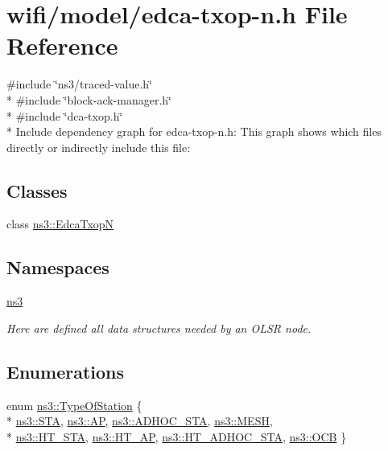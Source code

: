 \hypertarget{edca-txop-n_8h}{}\section{wifi/model/edca-\/txop-\/n.h File Reference}
\label{edca-txop-n_8h}
{\ttfamily \#include \char`\"{}ns3/traced-\/value.\+h\char`\"{}}\\*
{\ttfamily \#include \char`\"{}block-\/ack-\/manager.\+h\char`\"{}}\\*
{\ttfamily \#include \char`\"{}dca-\/txop.\+h\char`\"{}}\\*
Include dependency graph for edca-\/txop-\/n.h\+:
This graph shows which files directly or indirectly include this file\+:
\subsection*{Classes}
\begin{DoxyCompactItemize}
\item 
class \hyperlink{classns3_1_1EdcaTxopN}{ns3\+::\+Edca\+TxopN}
\end{DoxyCompactItemize}
\subsection*{Namespaces}
\begin{DoxyCompactItemize}
\item 
 \hyperlink{namespacens3}{ns3}
\begin{DoxyCompactList}\small\item\em Here are defined all data structures needed by an O\+L\+SR node. \end{DoxyCompactList}\end{DoxyCompactItemize}
\subsection*{Enumerations}
\begin{DoxyCompactItemize}
\item 
enum \hyperlink{namespacens3_a21fd18ff410cecc971a0c27634830445}{ns3\+::\+Type\+Of\+Station} \{ \\*
\hyperlink{namespacens3_a21fd18ff410cecc971a0c27634830445aa1fe7589cc1205354fcb2e99e3b74edf}{ns3\+::\+S\+TA}, 
\hyperlink{namespacens3_a21fd18ff410cecc971a0c27634830445aed6b16257135c44d936ad7cc56f2336f}{ns3\+::\+AP}, 
\hyperlink{namespacens3_a21fd18ff410cecc971a0c27634830445a255dea8136dbcf713e232f83d81204a9}{ns3\+::\+A\+D\+H\+O\+C\+\_\+\+S\+TA}, 
\hyperlink{namespacens3_a21fd18ff410cecc971a0c27634830445a653cea365fff3d0529c9cdd558683db6}{ns3\+::\+M\+E\+SH}, 
\\*
\hyperlink{namespacens3_a21fd18ff410cecc971a0c27634830445aa77a91a93a65deb9620e16aa28e75986}{ns3\+::\+H\+T\+\_\+\+S\+TA}, 
\hyperlink{namespacens3_a21fd18ff410cecc971a0c27634830445abe065145227a7df9f37ef1e621e1193a}{ns3\+::\+H\+T\+\_\+\+AP}, 
\hyperlink{namespacens3_a21fd18ff410cecc971a0c27634830445a19999b1bb5720992a1b8ea7a352ad913}{ns3\+::\+H\+T\+\_\+\+A\+D\+H\+O\+C\+\_\+\+S\+TA}, 
\hyperlink{namespacens3_a21fd18ff410cecc971a0c27634830445af6c73fc227571b5f8954e1dd7552fc58}{ns3\+::\+O\+CB}
 \}
\end{DoxyCompactItemize}
